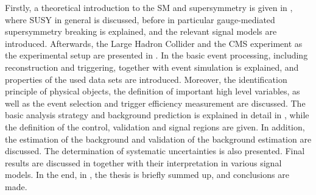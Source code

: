 Firstly, a theoretical introduction to the SM and supersymmetry is given in , where SUSY in general is discussed, before in particular gauge-mediated supersymmetry breaking is explained, and the relevant signal models are introduced. Afterwards, the Large Hadron Collider and the CMS experiment as the experimental setup are presented in . In  the basic event processing, including reconstruction and triggering, together with event simulation is explained, and properties of the used data sets are introduced. Moreover, the identification principle of physical objects, the definition of important high level variables, as well as the event selection and trigger efficiency measurement are discussed. The basic analysis strategy and background prediction is explained in detail in , while the definition of the control, validation and signal regions are given. In addition, the estimation of the background and validation of the background estimation are discussed. The determination of systematic uncertainties is also presented. Final results are discussed in  together with their interpretation in various signal models. In the end, in , the thesis is briefly summed up, and conclusions are made.
